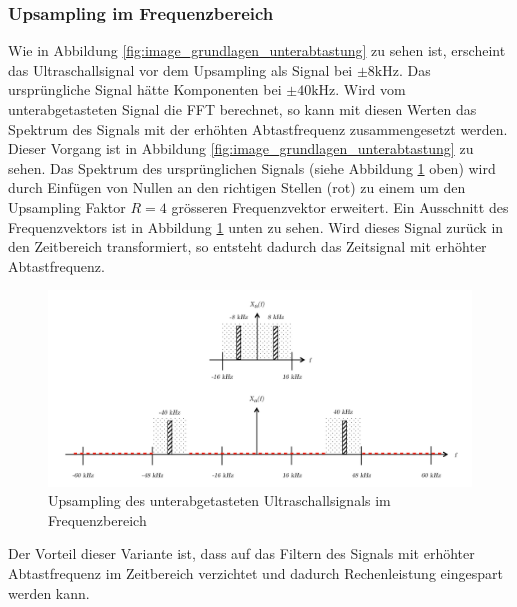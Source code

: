 \subsubsection{Upsampling im Frequenzbereich}\label{sec:upsampling_im_frequenzbereich}
Wie in Abbildung \ref{fig:image_grundlagen_unterabtastung} zu sehen ist, erscheint das Ultraschallsignal vor dem Upsampling als Signal bei $\pm 8 \mathrm{kHz}$. Das ursprüngliche Signal hätte Komponenten bei $\pm 40 \mathrm{kHz}$.
Wird vom unterabgetasteten Signal die FFT berechnet, so kann mit diesen Werten das Spektrum des Signals mit der erhöhten Abtastfrequenz zusammengesetzt werden. Dieser Vorgang ist in Abbildung \ref{fig:image_grundlagen_unterabtastung} zu sehen. Das Spektrum des ursprünglichen Signals (siehe Abbildung \ref{fig:image_grundlagen_upsampling} oben) wird durch Einfügen von Nullen an den richtigen Stellen (rot) zu einem um den Upsampling Faktor $R = 4$ grösseren Frequenzvektor erweitert. Ein Ausschnitt des Frequenzvektors ist in Abbildung \ref{fig:image_grundlagen_upsampling} unten zu sehen. Wird dieses Signal zurück in den Zeitbereich transformiert, so entsteht dadurch das Zeitsignal mit erhöhter Abtastfrequenz.

\begin{figure}[htb]
\begin{center}
\includegraphics[width=\textwidth]{graphics/image_grundlagen_upsampling.png}
\end{center}
\caption{Upsampling des unterabgetasteten Ultraschallsignals im Frequenzbereich} %
\label{fig:image_grundlagen_upsampling}
\end{figure}
%

Der Vorteil dieser Variante ist, dass auf das Filtern des Signals mit erhöhter Abtastfrequenz im Zeitbereich verzichtet und dadurch Rechenleistung eingespart werden kann.

